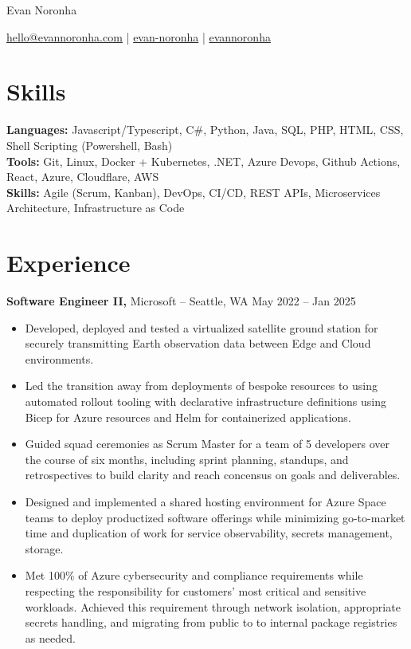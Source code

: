 \documentclass[11pt]{article}       %
\begin{document}
\centerline{\Huge Evan Noronha}

\vspace{5pt}

\centerline {\href{mailto:hello@evannoronha.com}{\faEnvelope \space hello@evannoronha.com} | \href{https://www.linkedin.com/in/evan-noronha/}{\faLinkedin \space evan-noronha} | \href{https://github.com/evannoronha}{\faGithub \space evannoronha}}

\vspace{-10pt}

\section*{Skills}
\textbf{Languages:} Javascript/Typescript, C\#, Python, Java, SQL, PHP, HTML, CSS, Shell Scripting (Powershell, Bash) \\
\textbf{Tools:} Git, Linux, Docker + Kubernetes, .NET, Azure Devops, Github Actions, React, Azure, Cloudflare, AWS \\
\textbf{Skills:} Agile (Scrum, Kanban), DevOps, CI/CD, REST APIs, Microservices Architecture, Infrastructure as Code \\

\vspace{-6.5pt}

\section*{Experience}
\textbf{Software Engineer II,} {Microsoft} -- Seattle, WA \hfill May 2022 -- Jan 2025 \\
\vspace{-9pt}
\begin{itemize}
  \item Developed, deployed and tested a virtualized satellite ground station for securely transmitting Earth observation data between Edge and Cloud environments.
  \item Led the transition away from deployments of bespoke resources to using automated rollout tooling with declarative infrastructure definitions using Bicep for Azure resources and Helm for containerized applications.
  \item Guided squad ceremonies as Scrum Master for a team of 5 developers over the course of six months, including sprint planning, standups, and retrospectives to build clarity and reach concensus on goals and deliverables.
  \item Designed and implemented a shared hosting environment for Azure Space teams to deploy productized software offerings while minimizing go-to-market time and duplication of work for service observability, secrets management, storage.
  \item Met 100\% of Azure cybersecurity and compliance requirements while respecting the responsibility for customers' most critical and sensitive workloads. Achieved this requirement through network isolation, appropriate secrets handling, and migrating from public to to internal package registries as needed.
\end{itemize}
\end{document}

